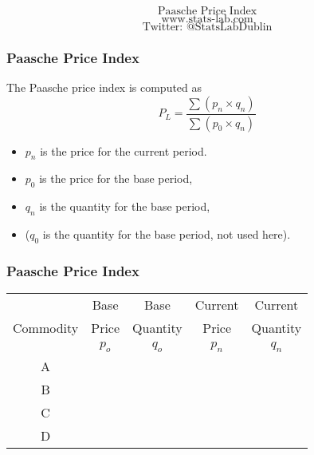 \documentclass{beamer}
\begin{document}
\begin{frame}
\bigskip
{
\Huge
\[ \mbox{Paasche Price Index}\]
}
{
\Large
\[ \mbox{www.stats-lab.com}\]
\[ \mbox{Twitter: @StatsLabDublin}\]
}
\end{frame}



\begin{frame}
\frametitle{Paasche Price Index}

\LARGE

The Paasche price index is computed as
\[  P_L=\frac{\sum (p_{n}\times q_{n})}{\sum (p_{0}\times q_{n})}  \]

\begin{itemize}
\item  $p_n$ is the price for the current period.
\item  $p_0$ is the price for the base period,
\item  $q_n$ is the quantity for the base period,
\item  ($q_0$ is the quantity for the base period, not used here).
\end{itemize}
\end{frame}



\begin{frame}
\frametitle{Paasche Price Index}
\Large
\vspace{-1cm}
\begin{center}
\begin{tabular}{|c||c|c||c|c|}
\hline   & Base & Base & Current & Current    \\ 
  Commodity & Price & Quantity & Price & Quantity     \\ 
\hline \hline & $p_o$ & $q_o$ & $p_n$ & $q_n$    \\ 
\hline A &  &  & &  \\ 
\hline B &  &   &  &\\ 
\hline C &  &    &  &\\ 
\hline D &  &  &  &\\ \hline

\end{tabular} 
\end{center}

\end{frame}
\end{document}
